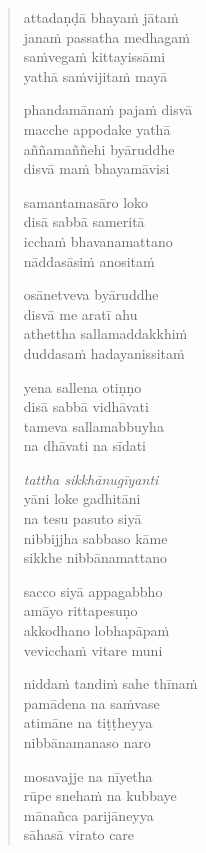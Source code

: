 

\cleartoverso

\vspace*{30mm}

\begin{verse}

attadaṇḍā bhayaṁ jātaṁ\\
janaṁ passatha medhagaṁ\\
saṁvegaṁ kittayissāmi\\
yathā saṁvijitaṁ mayā

phandamānaṁ pajaṁ disvā\\
macche appodake yathā\\
aññamaññehi byāruddhe\\
disvā maṁ bhayamāvisi

samantamasāro loko\\
disā sabbā sameritā\\
icchaṁ bhavanamattano\\
nāddasāsiṁ anositaṁ

osānetveva byāruddhe\\
disvā me aratī ahu\\
athettha sallamaddakkhiṁ\\
duddasaṁ hadayanissitaṁ

yena sallena otiṇṇo\\
disā sabbā vidhāvati\\
tameva sallamabbuyha\\
na dhāvati na sīdati

\emph{tattha sikkhānugīyanti}\\
yāni loke gadhitāni\\
na tesu pasuto siyā\\
nibbijjha sabbaso kāme\\
sikkhe nibbānamattano

sacco siyā appagabbho\\
amāyo rittapesuṇo\\
akkodhano lobhapāpaṁ\\
vevicchaṁ vitare muni

niddaṁ tandiṁ sahe thīnaṁ\\
pamādena na saṁvase\\
atimāne na tiṭṭheyya\\
nibbānamanaso naro

mosavajje na nīyetha\\
rūpe snehaṁ na kubbaye\\
mānañca parijāneyya\\
sāhasā virato care


\end{verse}
